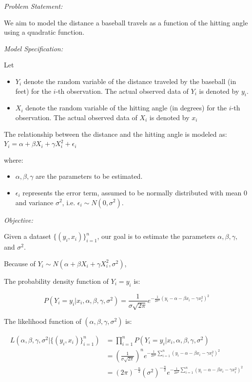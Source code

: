 \begin{examplebox}{}

\emph{Problem Statement:}

We aim to model the distance a baseball travels as a function of the hitting angle using a quadratic function.

\emph{Model Specification:}

Let
\begin{itemize}
	\item $Y_{i}$ denote the random variable of the distance traveled by the baseball (in feet) for the $i$-th observation. The actual observed data of $Y_{i}$ is denoted by $y_{i}$.
	\item $X_{i}$ denote the random variable of the hitting angle (in degrees) for the $i$-th observation. The actual observed data of $X_{i}$ is denoted by $x_{i}$
\end{itemize}

The relationship between the distance and the hitting angle is modeled as:
$Y_{i} = \alpha + \beta X_{i} + \gamma X_{i}^{2 } + \epsilon_{i}$

where:
\begin{itemize}
	\item $\alpha,\beta,\gamma$ are the parameters to be estimated.
	\item $\epsilon_{i}$ represents the error term, assumed to be normally distributed with mean $0$ and variance $\sigma^{2}$, i.e. $\epsilon_{i} \sim N(0, \sigma^{2})$.
\end{itemize}

\emph{Objective:}

Given a dataset $\{(y_{i}, x_{i})\}^{n }_{i=1}$, our goal is to estimate the parameters $\alpha, \beta, \gamma,$ and $\sigma^{2}$.

\end{examplebox}

Because of $Y_{i} \sim N(\alpha + \beta X_{i} + \gamma X_{i}^{2}, \sigma^{2})$,

The probability density function of $Y_{i } = y_{i}$ is:

\[
P(Y_{i } = y_{i }|x_{i}, \alpha, \beta, \gamma, \sigma^{2}) = \frac{1 }{\sigma\sqrt{2 \pi }} e^{- \frac{1 }{2 \sigma^{2 }}(y_{i }-\alpha-\beta x_{i } - \gamma x_{i }^{2})^{2}}
\]

The likelihood function of $(\alpha,\beta,\gamma,\sigma^{2})$ is:

\begin{align*}
	L(\alpha,\beta,\gamma,\sigma^{2}|\{(y_{i}, x_{i})\}^{n }_{i=1}) &= \prod^{n }_{i=1 }P(Y_{i } = y_{i }|x_{i}, \alpha, \beta, \gamma, \sigma^{2}) \\
	&=\left(\frac{1 }{\sigma\sqrt{2 \pi }}\right)^{n} e^{- \frac{1 }{2 \sigma^{2 }} \sum^{n }_{i=1}(y_{i }-\alpha-\beta x_{i } - \gamma x_{i }^{2})^{2}}\\
	&=(2\pi)^{-\frac{n }{2 }} (\sigma^{2 })^{-\frac{n}{2}} e^{-\frac{1}{2 \sigma^{2}} \sum^{n }_{i=1}(y_{i }-\alpha-\beta x_{i } - \gamma x_{i }^{2})^{2}}\\
\end{align*}

